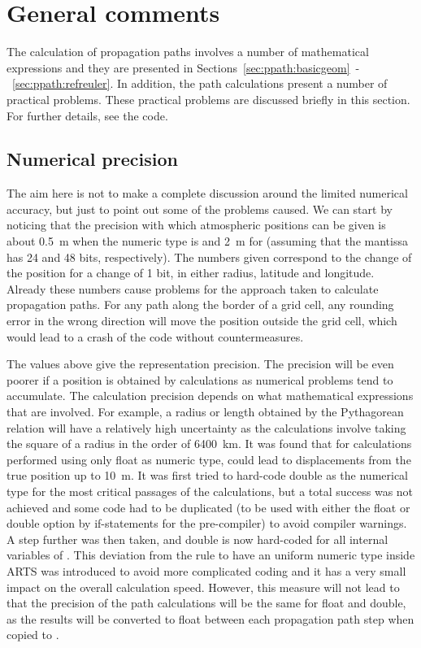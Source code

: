 \section{General comments}
\label{sec:ppath:comments}

The calculation of propagation paths involves a number of mathematical
expressions and they are presented in
Sections~\ref{sec:ppath:basicgeom}~-~\ref{sec:ppath:refreuler}. In
addition, the path calculations present a number of practical
problems. These practical problems are discussed briefly in this
section. For further details, see the code.


\subsection{Numerical precision}

The aim here is not to make a complete discussion around the limited
numerical accuracy, but just to point out some of the problems caused.
We can start by noticing that the precision with which atmospheric
positions can be given is about 0.5~m when the numeric type is
 and 2~m for 
(assuming that the mantissa has 24 and 48 bits, respectively). The
numbers given correspond to the change of the position for a change of
1 bit, in either radius, latitude and longitude. Already these numbers
cause problems for the approach taken to calculate propagation paths.
For any path along the border of a grid cell, any rounding error in
the wrong direction will move the position outside the grid cell,
which would lead to a crash of the code without countermeasures.

The values above give the representation precision. The precision will
be even poorer if a position is obtained by calculations as numerical
problems tend to accumulate. The calculation precision depends on what
mathematical expressions that are involved.  For example, a radius or
length obtained by the Pythagorean relation will have a relatively
high uncertainty as the calculations involve taking the square of a
radius in the order of 6400~km. It was found that for calculations
performed using only float as numeric type, could lead to
displacements from the true position up to 10~m. It was first tried to
hard-code double as the numerical type for the most critical passages
of the calculations, but a total success was not achieved and some
code had to be duplicated (to be used with either the float or double
option by if-statements for the pre-compiler) to avoid compiler
warnings. A step further was then taken, and double is now hard-coded
for all internal variables of . This deviation
from the rule to have an uniform numeric type inside ARTS was
introduced to avoid more complicated coding and it has a very small
impact on the overall calculation speed. However, this measure will
not lead to that the precision of the path calculations will be the
same for float and double, as the results will be converted to float
between each propagation path step when copied to
.

